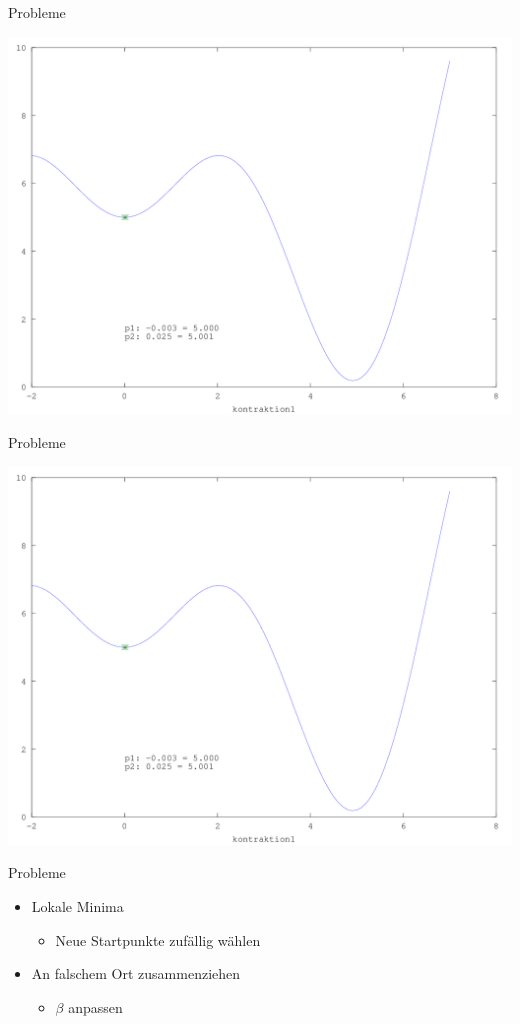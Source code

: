 \documentclass[\outputformat]{beamer}
\begin{document}
\begin{frame}{Probleme}
	\begin{center}
		\includegraphics[height=0.75\paperheight]{../bilder/LokMinima/sinx_x009.png}
	\end{center}
\end{frame}
\begin{frame}{Probleme}
	\begin{center}
		\includegraphics[height=0.75\paperheight]{../bilder/LokMinima/sinx_x009.png}
	\end{center}
\end{frame}

\begin{frame}{Probleme}
\begin{itemize}
\item Lokale Minima
	\begin{itemize}
	\item Neue Startpunkte zufällig wählen
	\end{itemize}
\item An falschem Ort zusammenziehen
	\begin{itemize}
	\item $\beta$ anpassen
	\end{itemize}
\end{itemize}
\end{frame}


\end{document}
